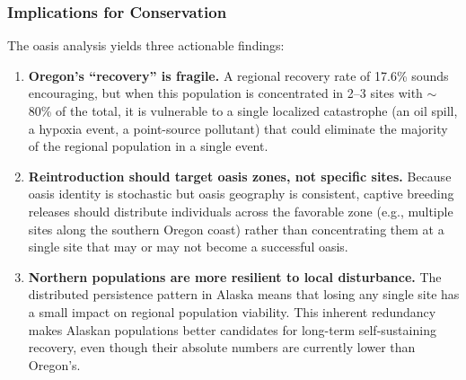 \subsubsection{Implications for Conservation}

The oasis analysis yields three actionable findings:

\begin{enumerate}
  \item \textbf{Oregon's ``recovery'' is fragile.}  A regional recovery
    rate of 17.6\% sounds encouraging, but when this population is
    concentrated in 2--3 sites with $\sim$80\% of the total, it is
    vulnerable to a single localized catastrophe (an oil spill, a hypoxia
    event, a point-source pollutant) that could eliminate the majority
    of the regional population in a single event.

  \item \textbf{Reintroduction should target oasis zones, not specific
    sites.}  Because oasis identity is stochastic but oasis geography is
    consistent, captive breeding releases should distribute individuals
    across the favorable zone (e.g., multiple sites along the southern
    Oregon coast) rather than concentrating them at a single site that
    may or may not become a successful oasis.

  \item \textbf{Northern populations are more resilient to local
    disturbance.}  The distributed persistence pattern in Alaska means
    that losing any single site has a small impact on regional population
    viability.  This inherent redundancy makes Alaskan populations better
    candidates for long-term self-sustaining recovery, even though their
    absolute numbers are currently lower than Oregon's.
\end{enumerate}
